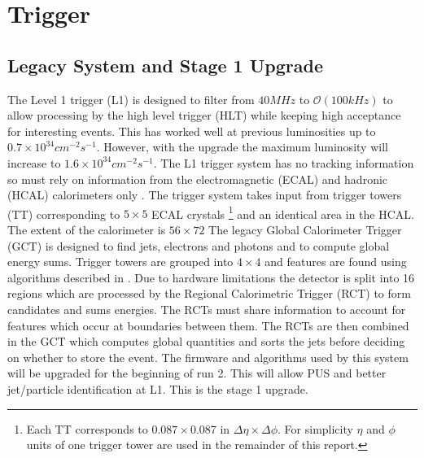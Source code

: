 
\chapter{Trigger} %

\label{Chapter4} %



\section{Legacy System and Stage 1 Upgrade}
The Level 1 trigger (L1) is designed to filter from $40MHz$ to $\mathcal{O}(100kHz)$ to allow processing by the high level trigger (HLT) while keeping high acceptance for interesting events. This has worked well at previous luminosities up to $0.7\times10^{34} cm^{-2}s^{-1}$. However, with the upgrade the maximum luminosity will increase to $1.6\times10^{34} cm^{-2}s^{-1}$. The L1 trigger system has no tracking information so must rely on information from the electromagnetic (ECAL) and hadronic (HCAL) calorimeters only \cite{gct}. The trigger system takes input from  trigger towers (TT) corresponding to $5\times5$ ECAL crystals \footnote{Each TT corresponds to $0.087\times0.087$ in $\Delta\eta\times\Delta\phi$. For simplicity $\eta$ and $\phi$ units of one trigger tower are used in the remainder of this report.} and an identical area in the HCAL. The extent of the calorimeter is $56\times72$ The legacy Global Calorimeter Trigger (GCT) is designed to find jets, electrons and photons and to compute global energy sums. Trigger towers are grouped into $4\times4$ and features are found using algorithms described in \cite{algos}. Due to hardware limitations the detector is split into 16 regions which are processed by the Regional Calorimetric Trigger (RCT) to form candidates and sums energies. The RCTs must share information to account for features which occur at boundaries between them. The RCTs are then combined in the GCT which computes global quantities and sorts the jets before deciding on whether to store the event. The firmware and algorithms used by this system will be upgraded for the beginning of run 2. This will allow PUS and better jet/particle identification at L1. This is the stage 1 upgrade. 
